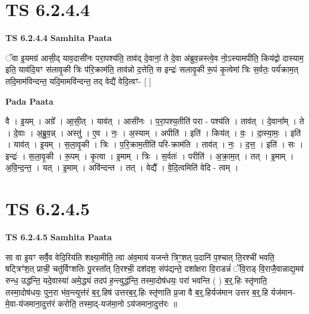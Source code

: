 \documentclass[17pt]{extarticle}
\begin{document}

\section{ TS 6.2.4.4 }

\textbf{TS 6.2.4.4 } \newline
\textbf{Samhita Paata} \newline

ॅवा इ॒यमग्र॑ आसी॒द् याव॒दासी॑नः परा॒पश्य॑ति॒ ताव॑द् दे॒वानां॒ ते दे॒वा अ॑ब्रुव॒न्नस्त्वे॒व नो॒ऽस्यामपीति॒ किय॑द्वो दास्याम॒ इति॒ याव॑दि॒यꣳ स॑लावृ॒की त्रिः प॑रि॒क्राम॑ति॒ ताव॑न्नो द॒त्तेति॒ स इन्द्रः॑ सलावृ॒की रू॒पं कृ॒त्वेमां त्रिः स॒र्वतः॒ पर्य॑क्राम॒त् तदि॒माम॑विन्दन्त॒ यदि॒मामवि॑न्दन्त॒ तद् वेद्यै॑ वेदि॒त्वꣳ- [  ] \newline

\textbf{Pada Paata} \newline

वै । इ॒यम् । अग्रे᳚ । आ॒सी॒त् । याव॑त् । आसी॑नः । प॒रा॒पश्य॒तीति॑ परा - पश्य॑ति । ताव॑त् । दे॒वाना᳚म् । ते । दे॒वाः । अ॒ब्रु॒व॒न्न् । अस्तु॑ । ए॒व । नः॒ । अ॒स्याम् । अपीति॑ । इति॑ । किय॑त् । वः॒ । दा॒स्या॒मः॒ । इति॑ । याव॑त् । इ॒यम् । स॒ला॒वृ॒की । त्रिः । प॒रि॒क्राम॒तीति॑ परि-क्राम॑ति । ताव॑त् । नः॒ । द॒त्त॒ । इति॑ । सः । इन्द्रः॑ । स॒ला॒वृ॒की । रू॒पम् । कृ॒त्वा । इ॒माम् । त्रिः । स॒र्वतः॑ । परीति॑ । अ॒क्रा॒म॒त् । तत् । इ॒माम् । अ॒वि॒न्द॒न्त॒ । यत् । इ॒माम् । अवि॑न्दन्त । तत् । वेद्यै᳚ । वे॒दि॒त्वमिति॑ वेदि - त्वम् ।  \newline





\section{ TS 6.2.4.5 }

\textbf{TS 6.2.4.5 } \newline
\textbf{Samhita Paata} \newline

सा वा इ॒यꣳ सर्वै॒व वेदि॒रिय॑ति शक्ष्या॒मीति॒ त्वा अ॑व॒माय॑ यजन्ते त्रिꣳ॒॒शत् प॒दानि॑ प॒श्चात् ति॒रश्ची॑ भवति॒ षट्त्रिꣳ॑श॒त् प्राची॒ चतु॑र्विꣳशतिः पु॒रस्ता᳚त् ति॒रश्ची॒ दश॑दश॒ संप॑द्यन्ते॒ दशा᳚क्षरा वि॒राडन्नं॑ ॅवि॒राड् वि॒राजै॒वान्नाद्य॒मव॑ रुन्ध॒ उद्ध॑न्ति॒ यदे॒वास्या॑ अमे॒द्ध्यं तदप॑ ह॒न्त्युद्ध॑न्ति॒ तस्मा॒दोष॑धयः॒ परा॑ भवन्ति ( ) ब॒र्॒.हिः स्तृ॑णाति॒ तस्मा॒दोष॑धयः॒ पुन॒रा भ॑व॒न्त्युत्त॑रं ब॒र्॒.हिष॑ उत्तरब॒र्॒.हिः स्तृ॑णाति प्र॒जा वै ब॒र्॒.हिर्यज॑मान उत्तर ब॒र्॒.हि र्यज॑मान-मे॒वा-य॑जमाना॒दुत्त॑रं करोति॒ तस्मा॒द्-यज॑मा॒नो ऽय॑जमाना॒दुत्त॑रः ॥ \newline
\end{document}
